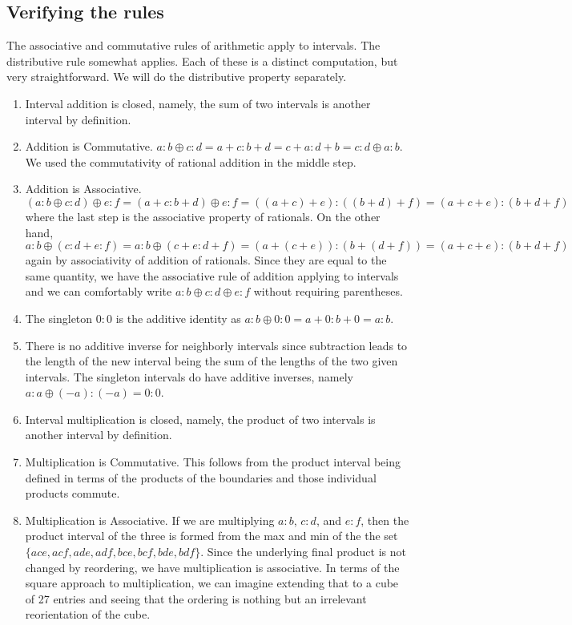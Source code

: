\documentclass[12pt]{article}
\theoremstyle{remark}
\begin{document}
\subsection{Verifying the rules}\label{sec:rules}

The associative and commutative rules of arithmetic apply to intervals. The distributive rule somewhat applies. Each of these is a distinct computation, but very straightforward. We will do the distributive property separately. 

\begin{enumerate}
    \item Interval addition is closed, namely, the sum of two intervals is another interval by definition. 
    \item Addition is Commutative. $a:b \oplus c:d= a+c : b+d = c+a:d+b = c:d \oplus a:b$. We used the commutativity of rational addition in the middle step. 
    \item Addition is Associative. $(a:b \oplus c:d) \oplus e:f = (a+c:b+d) \oplus e:f = ((a+c)+e):((b+d)+f) = (a+c+e):(b+d+f)$ where the last step is the associative property of rationals.  On the other hand, $a:b \oplus (c:d+e:f) = a:b \oplus (c+e:d+f) = (a+(c+e)):(b+(d+f)) = (a+c+e):(b+d+f)$ again by associativity of addition of rationals. Since they are equal to the same quantity, we have the associative rule of addition applying to intervals and we can comfortably write $a:b \oplus c:d \oplus e:f$ without requiring parentheses. 
    \item The singleton $0:0$ is the additive identity as $a:b \oplus 0:0 = a+0:b+0 = a:b$. 
    \item There is no additive inverse for neighborly intervals since subtraction leads to the length of the new interval being the sum of the lengths of the two given intervals. The singleton intervals do have additive inverses, namely $a:a \oplus (-a):(-a) = 0:0$. 
    \item Interval multiplication is closed, namely, the product of two intervals is another interval by definition. 
    \item Multiplication is Commutative. This follows from the product interval being defined in terms of the products of the boundaries and those individual products commute. 
    \item Multiplication is Associative. If we are multiplying $a:b$, $c:d$, and $e:f$, then the product interval of the three is formed from the max and min of the the set $\{ace, acf, ade, adf, bce, bcf, bde, bdf\}$. Since the underlying final product is not changed by reordering, we have multiplication is associative. In terms of the square approach to multiplication, we can imagine extending that to a cube of 27 entries and seeing that the ordering is nothing but an irrelevant reorientation of the cube. 

\end{enumerate}
\end{document}
